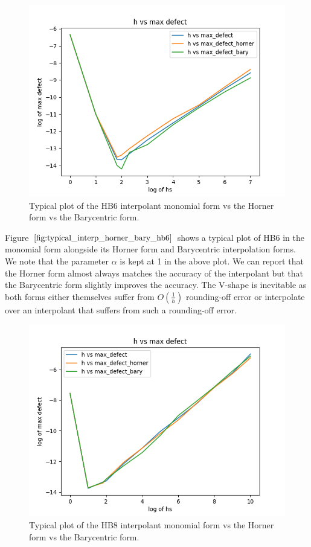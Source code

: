 \begin{figure}[H]
\centering
\includegraphics[width=0.7\linewidth]{./figures/typical_interp_horner_bary_hb6}
\caption{Typical plot of the HB6 interpolant monomial form vs the Horner form vs the Barycentric form.}
\label{fig:typical_interp_horner_bary_hb6}
\end{figure}

Figure $\ref{fig:typical_interp_horner_bary_hb6}$ shows a typical plot of HB6 in the monomial form alongside its Horner form and Barycentric interpolation forms. We note that the parameter $\alpha$ is kept at 1 in the above plot. We can report that the Horner form almost always matches the accuracy of the interpolant but that the Barycentric form slightly improves the accuracy. The V-shape is inevitable as both forms either themselves suffer from $O(\frac{1}{h})$ rounding-off error or interpolate over an interpolant that suffers from such a rounding-off error.

\begin{figure}[H]
\centering
\includegraphics[width=0.7\linewidth]{./figures/typical_interp_horner_bary_hb8}
\caption{Typical plot of the HB8 interpolant monomial form vs the Horner form vs the Barycentric form.}
\label{fig:typical_interp_horner_bary_hb8}
\end{figure}

